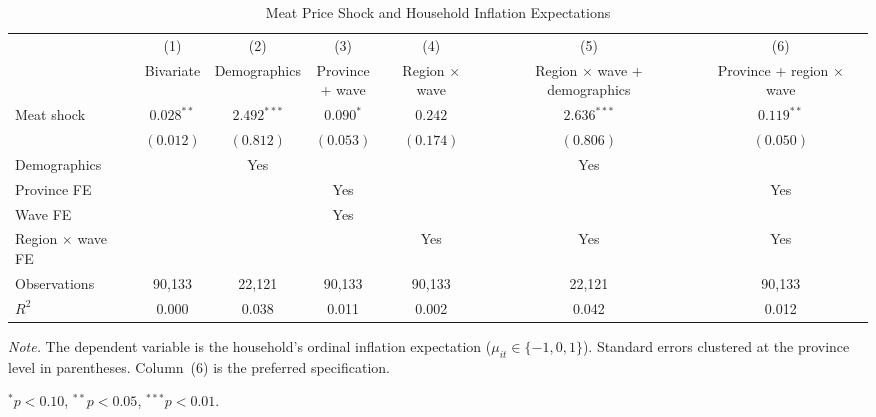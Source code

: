 \begin{table}[!htbp]
\centering
\caption{Meat Price Shock and Household Inflation Expectations}
\label{tab:eq1_expectations}
\begin{threeparttable}
\footnotesize
\setlength{\tabcolsep}{3pt}
\begin{tabular}{lcccccc}
\toprule
& (1) & (2) & (3) & (4) & (5) & (6) \\
& Bivariate & Demographics & \shortstack{Province\\+ wave} & \shortstack{Region\\$\times$ wave} & \shortstack{Region $\times$ wave\\+ demographics} & \shortstack{Province +\\region $\times$ wave} \\
\midrule
Meat shock & $0.028^{**}$ & $2.492^{***}$ & $0.090^{*}$ & $0.242$ & $2.636^{***}$ & $0.119^{**}$ \\
& $(0.012)$ & $(0.812)$ & $(0.053)$ & $(0.174)$ & $(0.806)$ & $(0.050)$ \\[6pt]
Demographics &  & Yes &  &  & Yes &  \\
Province FE &  &  & Yes &  &  & Yes \\
Wave FE &  &  & Yes &  &  &  \\
Region $\times$ wave FE &  &  &  & Yes & Yes & Yes \\
\midrule
Observations & 90,133 & 22,121 & 90,133 & 90,133 & 22,121 & 90,133 \\
$R^2$ & 0.000 & 0.038 & 0.011 & 0.002 & 0.042 & 0.012 \\
\bottomrule
\end{tabular}
\begin{tablenotes}[flushleft]
\footnotesize
\item \textit{Note.} The dependent variable is the household's ordinal inflation expectation ($\mu_{it} \in \{-1, 0, 1\}$). Standard errors clustered at the province level in parentheses. Column~(6) is the preferred specification.
\item $^{*}p<0.10$, $^{**}p<0.05$, $^{***}p<0.01$.
\end{tablenotes}
\end{threeparttable}
\end{table}
